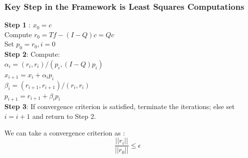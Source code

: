 \documentclass{beamer}
\begin{document}
\begin{frame}
\frametitle{Key Step in the Framework is Least Squares Computations }
\textbf{Step 1} : $x_0 = c$ \\
\hspace{.5in} Compute $r_0 = Tf - \boxed{(I-Q)c} = Qc$\\
\hspace{.5in} Set $p_0 = r_0, i = 0$ \\
\textbf{Step 2}:  Compute: \\
\hspace{.5in} $\alpha_i = (r_i, r_i)/(p_i,\boxed{(I-Q)p_i})$ \\
\hspace{.5in} $ x_{i+1} = x_i + \alpha_i p_i $ \\
\hspace{.5in} $\beta_i = (r_{i+1}, r_{i+1})/(r_i, r_i) $ \\
\hspace{.5in} $p_{i+1} = r_{i+1} + \beta_i p _i $ \\
\textbf{Step 3}: If convergence criterion is satisfied, terminate the iterations; else set $i = i+1$ and return to Step 2.

\vspace{.4in}
 We can take a convergence criterion as : $$ \frac{ ||r_i||}{||r_0||} \leq \epsilon$$
\end{frame}






\end{document}
